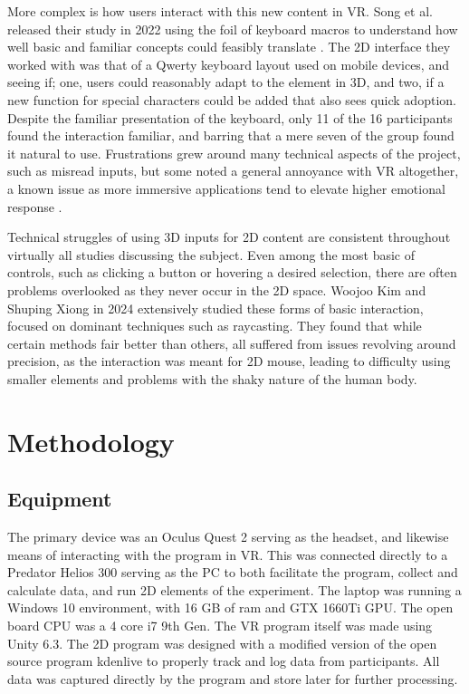 \documentclass[manuscript, review]{acmart}
\begin{document}
More complex is how users interact with this new content in VR. Song et al. released their study in 2022 using the foil of keyboard macros to understand how well basic and familiar concepts could feasibly translate \cite{9995649}. The 2D interface they worked with was that of a Qwerty keyboard layout used on mobile devices, and seeing if; one, users could reasonably adapt to the element in 3D, and two, if a new function for special characters could be added that also sees quick adoption. Despite the familiar presentation of the keyboard, only 11 of the 16 participants found the interaction familiar, and barring that a mere seven of the group found it natural to use. Frustrations grew around many technical aspects of the project, such as misread inputs, but some noted a general annoyance with VR altogether, a known issue as more immersive applications tend to elevate higher emotional response \cite{10443512}.

Technical struggles of using 3D inputs for 2D content are consistent throughout virtually all studies discussing the subject. Even among the most basic of controls, such as clicking a button or hovering a desired selection, there are often problems overlooked as they never occur in the 2D space. Woojoo Kim and Shuping Xiong in 2024 \cite{KimWoojoo2024TMTo} extensively studied these forms of basic interaction, focused on dominant techniques such as raycasting. They found that while certain methods fair better than others, all suffered from issues revolving around precision, as the interaction was meant for 2D mouse, leading to difficulty using smaller elements and problems with the shaky nature of the human body.

\section{Methodology}

\subsection{Equipment}

The primary device was an Oculus Quest 2 serving as the headset, and likewise means of interacting with the program in VR. This was connected directly to a Predator Helios 300 serving as the PC to both facilitate the program, collect and calculate data, and run 2D elements of the experiment. The laptop was running a Windows 10 environment, with 16 GB of ram and GTX 1660Ti GPU. The open board CPU was a 4 core i7 9th Gen. The VR program itself was made using Unity 6.3. The 2D program was designed with a modified version of the open source program kdenlive to properly track and log data from participants. All data was captured directly by the program and store later for further processing.
\end{document}
